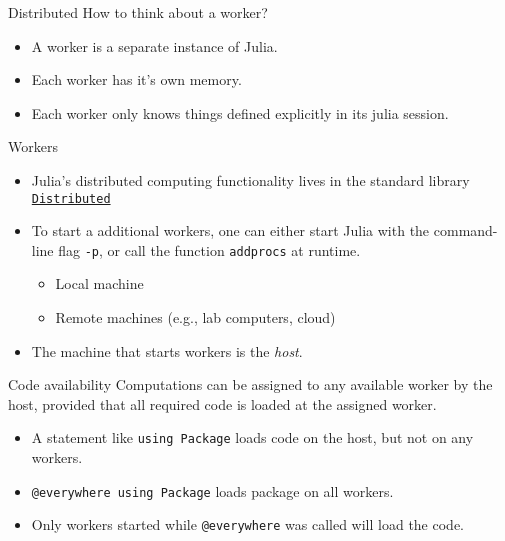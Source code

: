 \documentclass{beamer}
\begin{document}
\begin{frame}{Distributed}{}
	How to think about a worker?

	\begin{itemize}
		\item A worker is a separate instance of Julia.
		\item Each worker has it's own memory.
		\item Each worker only knows things defined explicitly in its julia session.
	\end{itemize}
\end{frame}

\begin{frame}{Workers}{}
	\begin{itemize}
		\item Julia's distributed computing functionality lives in the standard library \href{https://docs.julialang.org/en/v1/stdlib/Distributed/}{\texttt{Distributed}}
		\item To start a additional workers, one can either start Julia with the command-line flag \texttt{-p}, or call the function \texttt{addprocs} at runtime.
		\begin{itemize}
			\item Local machine
			\item Remote machines (e.g., lab computers, cloud)
		\end{itemize}
		\item The machine that starts workers is the \emph{host}.
	\end{itemize}

\end{frame}
\begin{frame}{Code availability}{}
	Computations can be assigned to any available worker by the host, provided that all required code is loaded at the assigned worker.
	\begin{itemize}
		\item A statement like \texttt{using Package} loads code on the host, but not on any workers.
		\item \texttt{@everywhere using Package} loads package on all workers.
		\item Only workers started while \texttt{@everywhere} was called will load the code.
	\end{itemize}
\end{frame}
\end{document}
